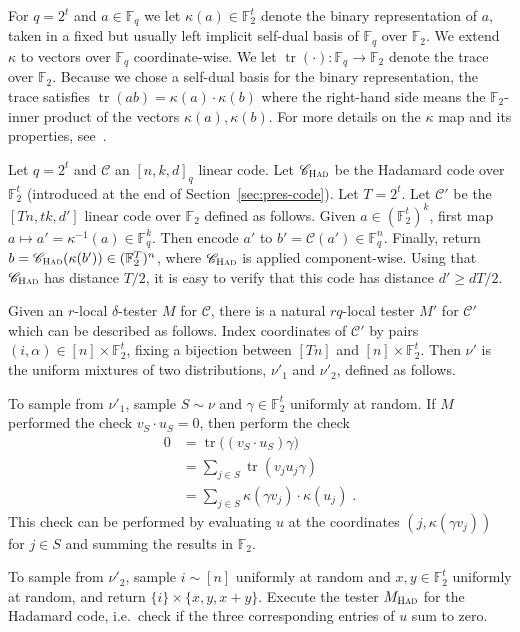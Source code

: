 \documentclass[11pt]{article}
\theoremstyle{definition}
\newcommand{\code}{\mathscr{C}}
\newcommand{\F}{\ensuremath{\mathbb{F}}}
\newcommand{\Had}{\ensuremath{\textsc{Had}}}
\newcommand{\had}{\textsc{Had}}
\DeclareMathOperator{\tr}{tr}
\begin{document}
For $q=2^t$ and $a\in \F_q$ we let $\kappa(a)\in\F_2^t$ denote the binary representation of $a$, taken in a fixed but usually left implicit self-dual basis of $\F_{q}$ over $\F_2$. We extend $\kappa$ to vectors over $\F_q$ coordinate-wise. We let $\tr(\cdot):\F_q\to\F_2$ denote the trace over $\F_2$. Because we chose a self-dual basis for the binary representation, the trace satisfies $\tr(ab)=\kappa(a)\cdot\kappa(b)$  where the right-hand side means the $\F_2$-inner product of the vectors $\kappa(a), \kappa(b)$. For more details on the $\kappa$ map and its properties, see~\cite[Section 3.3]{ji2020mip}.

Let $q=2^t$ and $\code$ an $[n,k,d]_q$ linear code. Let $\code_{\Had}$ be the Hadamard code over $\F_2^t$ (introduced at the end of Section~\ref{sec:pres-code}). Let $T=2^t$.
Let $\code'$ be the $[Tn,tk,d']$ linear code over $\F_2$ defined as follows. Given $a\in (\F_2^t)^{k}$, first map $a\mapsto a'=\kappa^{-1}(a) \in \F_q^{k}$. Then encode $a'$ to $b'=\code(a')\in \F_q^n$. Finally, return $b=\code_\Had(\kappa(b'))\in(\F_2^T)^n$, where $\code_\Had$ is applied component-wise. Using that $\code_\Had$ has distance $T/2$, it is easy to verify that this code has distance $d'\geq dT/2$.

Given an $r$-local $\delta$-tester $M$ for $\code$, there is a natural $rq$-local tester $M'$ for $\code'$ which can be described as follows. Index coordinates of $\code'$ by pairs $(i,\alpha)\in [n]\times\F_2^t$, fixing a bijection between $[Tn]$ and $[n]\times \F_2^t$. Then $\nu'$ is the uniform mixtures of two distributions, $\nu'_1$ and $\nu'_2$, defined as follows. 

To sample from $\nu'_1$, sample $S\sim\nu$ and $\gamma\in \F_2^t$ uniformly at random. If $M$ performed the check $v_S \cdot u_S=0$, then perform the check 
\begin{align*}
0 &= \tr\big(( v_S \cdot u_S) \gamma\big)\\
&= \sum_{j\in S} \tr( v_{j} u_j \gamma) \\
&= \sum_{j\in S} \kappa(\gamma v_{j}) \cdot \kappa(u_j)\;.
\end{align*}
This check can be performed by evaluating $u$ at the coordinates $(j,\kappa(\gamma  v_{j}))$ for $j\in S$ and summing the results in $\F_2$. 

To sample from $\nu'_2$, sample $i\sim[n]$ uniformly at random and $x,y\in\F_2^t$ uniformly at random, and return $\{i\}\times\{x,y,x+y\}$. Execute the tester $M_\had$ for the Hadamard code, i.e.\ check if the three corresponding entries of $u$ sum to zero. 
\end{document}
